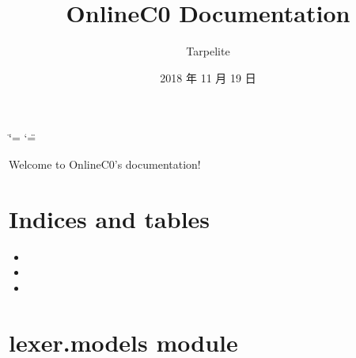 \documentclass[letterpaper,10pt,english]{sphinxmanual}
\title{OnlineC0 Documentation}
\date{2018 年 11 月 19 日}
\author{Tarpelite}
\begin{document}
\ifdefined\shorthandoff
  \ifnum\catcode`\=\string=\active\shorthandoff{=}\fi
  \ifnum\catcode`\"=\active{}\fi
\fi

\pagestyle{empty}
\maketitle
\pagestyle{plain}
\sphinxtableofcontents
\pagestyle{normal}
\label{\detokenize{index::doc}}


Welcome to OnlineC0’s documentation!


\chapter{Indices and tables}
\label{\detokenize{index:indices-and-tables}}\begin{itemize}
\item {} 

\item {} 

\item {} 

\end{itemize}


\chapter{lexer.models module}
\label{\detokenize{index:lexer-models-module}}\label{\detokenize{index:module-lexer.models}}
\end{document}

